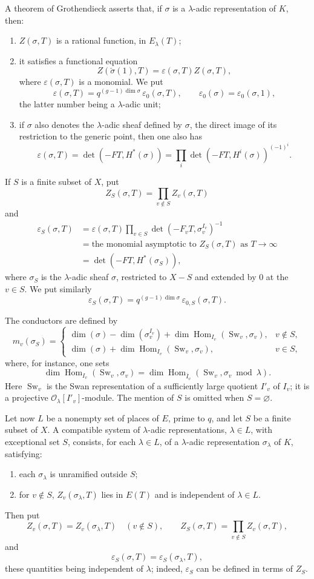 \documentclass[11pt]{article}
\newcommand{\Hom}{\operatorname{Hom}}
\newcommand{\Sw}{\operatorname{Sw}}
\newcommand{\dimn}{\operatorname{dim}}
\newcommand{\eps}{\varepsilon}
\newcommand{\cO}{\mathcal O}
\newcommand{\dual}[1]{\check{#1}}
\begin{document}
A theorem of Grothendieck asserts that, if $\sigma$ is a $\lambda$-adic representation of $K$, then:
\begin{enumerate}[label=\alph*)]
\item $Z(\sigma,T)$ is a rational function, in $E_\lambda(T)$;
\item it satisfies a functional equation
\[
 Z(\dual\sigma(1),T)=\eps(\sigma,T) Z(\sigma,T),
\]
where $\eps(\sigma,T)$ is a monomial. We put
\[
 \eps(\sigma,T)=q^{(g-1)\dimn\sigma}\,\eps_0(\sigma,T),
 \qquad \eps_0(\sigma)=\eps_0(\sigma,1),
\]
the latter number being a $\lambda$-adic unit;
\item if $\sigma$ also denotes the $\lambda$-adic sheaf defined by $\sigma$, the direct image of its restriction to the generic point, then one also has
\[
 \eps(\sigma,T)=\det(-FT,H^*(\sigma))
 =\prod_i \det(-FT,H^i(\sigma))^{(-1)^i}.
\]
\end{enumerate}

If $S$ is a finite subset of $X$, put
\[
 Z_S(\sigma,T)=\prod_{v\notin S} Z_v(\sigma,T)
\]
and
\begin{align*}
 \eps_S(\sigma,T)
 &=\eps(\sigma,T)\prod_{v\in S}\det(-F_vT,\sigma_v^{I_v})^{-1} \\
 &=\text{the monomial asymptotic to }Z_S(\sigma,T)\text{ as }T\to\infty \\
 &=\det(-FT,H^*(\sigma_S)),
\end{align*}
where $\sigma_S$ is the $\lambda$-adic sheaf $\sigma$, restricted to $X-S$ and extended by $0$ at the $v\in S$. We put similarly
\[
 \eps_S(\sigma,T)=q^{(g-1)\dimn\sigma}\,\eps_{0,S}(\sigma,T).
\]

The conductors are defined by
\[
 m_v(\sigma_S)=
 \begin{cases}
 \dimn(\sigma)-\dimn(\sigma_v^{I_v})+
 \dimn \Hom_{I_v}(\Sw_v,\sigma_v),& v\notin S,\\[0.4em]
 \dimn(\sigma)+\dimn \Hom_{I_v}(\Sw_v,\sigma_v),& v\in S,
 \end{cases}
\]
where, for instance, one sets
\[
 \dimn\Hom_{I_v}(\Sw_v,\sigma_v)=
 \dimn\Hom_{\overline I_v}(\Sw_v,\sigma_v\bmod \lambda).
\]
Here $\Sw_v$ is the Swan representation of a sufficiently large quotient $I'_v$ of $I_v$; it is a projective $\cO_\lambda[I'_v]$-module. The mention of $S$ is omitted when $S=\varnothing$.

Let now $L$ be a nonempty set of places of $E$, prime to $q$, and let $S$ be a finite subset of $X$. A compatible system of $\lambda$-adic representations, $\lambda\in L$, with exceptional set $S$, consists, for each $\lambda\in L$, of a $\lambda$-adic representation $\sigma_\lambda$ of $K$, satisfying:
\begin{enumerate}[label=(\roman*)]
\item each $\sigma_\lambda$ is unramified outside $S$;
\item for $v\notin S$, $Z_v(\sigma_\lambda,T)$ lies in $E(T)$ and is independent of $\lambda\in L$.
\end{enumerate}
Then put
\[
 Z_v(\sigma,T)=Z_v(\sigma_\lambda,T)\quad(v\notin S),
 \qquad
 Z_S(\sigma,T)=\prod_{v\notin S} Z_v(\sigma,T),
\]
and
\[
 \eps_S(\sigma,T)=\eps_S(\sigma_\lambda,T),
\]
these quantities being independent of $\lambda$; indeed, $\eps_S$ can be defined in terms of $Z_S$.
\end{document}
